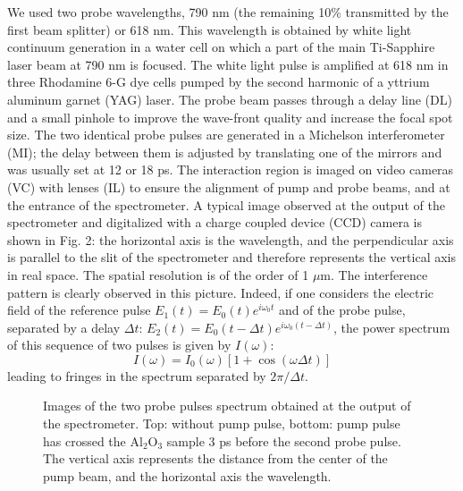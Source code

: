 \documentclass[aps,prb,reprint]{revtex4-2}
\begin{document}
We used two probe wavelengths, 790 nm (the remaining 10\% transmitted by the first beam splitter) or 618 nm. This wavelength is obtained by white light continuum generation in a water cell on which a part of the main Ti-Sapphire laser beam at 790 nm is focused. The white light pulse is amplified at 618 nm in three Rhodamine 6-G dye cells pumped by the second harmonic of a yttrium aluminum garnet (YAG) laser. The probe beam passes through a delay line (DL) and a small pinhole to improve the wave-front quality and increase the focal spot size. The two identical probe pulses are generated in a Michelson interferometer (MI); the delay between them is adjusted by translating one of the mirrors and was usually set at 12 or 18 ps. The interaction region is imaged on video cameras (VC) with lenses (IL) to ensure the alignment of pump and probe beams, and at the entrance of the spectrometer. A typical image observed at the output of the spectrometer and digitalized with a charge coupled device (CCD) camera is shown in Fig. 2: the horizontal axis is the wavelength, and the perpendicular axis is parallel to the slit of the spectrometer and therefore represents the vertical axis in real space. The spatial resolution is of the order of 1 $\mu$m. The interference pattern is clearly observed in this picture. Indeed, if one considers the electric field of the reference pulse $E_1(t) = E_0(t)e^{i\omega_0 t}$ and of the probe pulse, separated by a delay $\Delta t$: $E_2(t) = E_0(t-\Delta t)e^{i\omega_0(t-\Delta t)}$, the power spectrum of this sequence of two pulses is given by $I(\omega)$:
\begin{equation}
I(\omega) = I_0(\omega) \left[ 1 + \cos(\omega \Delta t) \right]
\end{equation}
leading to fringes in the spectrum separated by $2\pi/\Delta t$.

\begin{figure}[ht]
    \centering
    \caption{Images of the two probe pulses spectrum obtained at the output of the spectrometer. Top: without pump pulse, bottom: pump pulse has crossed the Al$_2$O$_3$ sample 3 ps before the second probe pulse. The vertical axis represents the distance from the center of the pump beam, and the horizontal axis the wavelength.}
    \label{fig:spectrum}
\end{figure}
\end{document}
